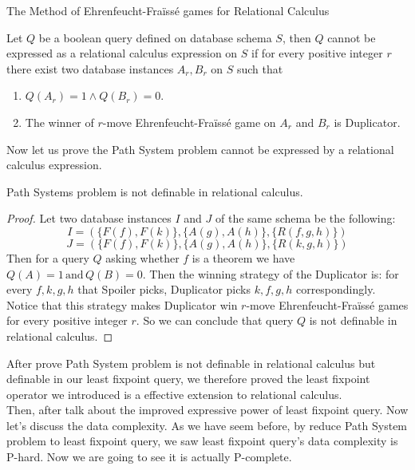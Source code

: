 \begin{description}
\item[The Method of Ehrenfeucht-Fra\"iss\'e games for Relational Calculus]
\end{description}
Let $Q$ be a boolean query defined on database schema $S$, then $Q$ cannot be expressed as a relational calculus expression on $S$ if for every positive integer $r$ there exist two database instances $A_r, B_r$ on $S$ such that
\begin{enumerate}
    \item $Q(A_r)=1\land Q(B_r)=0$.
    \item The winner of $r$-move Ehrenfeucht-Fra\"iss\'e game on $A_r$ and $B_r$ is Duplicator.
\end{enumerate}
Now let us prove the Path System problem cannot be expressed by a relational calculus expression.

\begin{claim}
Path Systems problem is not definable in relational calculus.
\end{claim}

\begin{proof}
Let two database instances $I$ and $J$ of the same schema be the following:
$$I=(\{F(f), F(k)\}, \{A(g),A(h)\},\{R(f,g,h)\})$$
$$J=(\{F(f), F(k)\}, \{A(g),A(h)\}, \{R(k,g,h)\})$$
Then for a query $Q$ asking whether $f$ is a theorem we have $Q(A)=1 \, \text{and} \, Q(B)=0$. Then the winning strategy of the Duplicator is: for every $f,k,g,h$ that Spoiler picks, Duplicator picks $k,f,g,h$ correspondingly. Notice that this strategy makes Duplicator win $r$-move Ehrenfeucht-Fra\"iss\'e games for every positive integer $r$. So we can conclude that query $Q$ is not definable in relational calculus.
\end{proof}

After prove Path System problem is not definable in relational calculus but definable in our least fixpoint query, we therefore proved the least fixpoint operator we introduced is a effective extension to relational calculus.\\

Then, after talk about the improved expressive power of least fixpoint query. Now let's discuss the data complexity. As we have seem before, by reduce Path System problem to least fixpoint query, we saw least fixpoint query's data complexity is P-hard. Now we are going to see it is actually P-complete.\\


